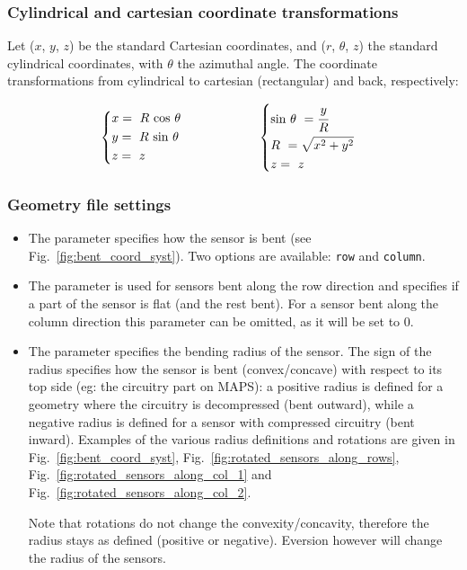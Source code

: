 \subsubsection{Cylindrical and cartesian coordinate transformations}
\label{sssec:cylindrical_coord_transformations}

Let ($x$, $y$, $z$) be the standard Cartesian coordinates, and ($r$, $\theta$, $z$) the standard cylindrical coordinates, with $\theta$ the azimuthal angle. The coordinate transformations from cylindrical to cartesian (rectangular) and back, respectively:

\begin{alignat*}{2}
  & \begin{dcases}
  x = \ R \ \text{cos $\theta$}\\
  y = \ R \ \text{sin $\theta$} \\
  z = \ z
  \end{dcases}
    & \hspace{5em} & \begin{dcases}
  \text{sin} \ \theta \ = \cfrac{y}{R}\\
  R \ = \sqrt{x^2+y^2} \\
  z = \ z
  \end{dcases}
\end{alignat*}



\subsubsection{Geometry file settings}
\label{sssec:cylindrical_coord_system_params}

\begin{itemize}
    \item The  parameter specifies how the sensor is bent (see Fig.~\ref{fig:bent_coord_syst}). Two options are available: \texttt{row} and \texttt{column}. 
    \item The  parameter is used for sensors bent along the row direction and specifies if a part of the sensor is flat (and the rest bent). For a sensor bent along the column direction this parameter can be omitted, as it will be set to 0. 
    \item The  parameter specifies the bending radius of the sensor. The sign of the radius specifies how the sensor is bent (convex/concave) with respect to its top side (eg: the circuitry part on MAPS): a positive radius is defined for a geometry where the circuitry is decompressed (bent outward), while a negative radius is defined for a sensor with compressed circuitry (bent inward). Examples of the various radius definitions and rotations are given in Fig.~\ref{fig:bent_coord_syst}, Fig.~\ref{fig:rotated_sensors_along_rows}, Fig.~\ref{fig:rotated_sensors_along_col_1} and Fig.~\ref{fig:rotated_sensors_along_col_2}. 
    
    Note that rotations do not change the convexity/concavity, therefore the radius stays as defined (positive or negative). Eversion however will change the radius of the sensors.
    \end{itemize}
    
